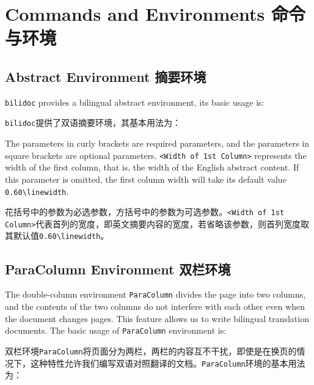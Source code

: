 \section{Commands and Environments 命令与环境}

\subsection{Abstract Environment 摘要环境}

\begin{ParaColumn}

    \verb"bilidoc" provides a bilingual abstract environment, its basic usage is:

    \switchcolumn

    \verb"bilidoc"提供了双语摘要环境，其基本用法为：

\end{ParaColumn}



\begin{ParaColumn}

    The parameters in curly brackets are required parameters, and the parameters in square brackets  are optional parameters.  \verb"<Width of 1st Column>" represents the width of the first column, that is, the width of the English abstract content. If this parameter is omitted, the first column width will take its default value \verb"0.60\linewidth".

    \switchcolumn

    花括号中的参数为必选参数，方括号中的参数为可选参数。\verb"<Width of 1st Column>"代表首列的宽度，即英文摘要内容的宽度，若省略该参数，则首列宽度取其默认值\verb"0.60\linewidth"。

\end{ParaColumn}

\subsection{ParaColumn Environment 双栏环境}

\begin{ParaColumn}

    The double-column environment \verb"ParaColumn" divides the page into two columns, and the contents of the two columns do not interfere with each other even when the document changes pages. This feature allows us to write bilingual translation documents.  The basic usage of \verb"ParaColumn" environment is:

    \switchcolumn

    双栏环境\verb"ParaColumn"将页面分为两栏，两栏的内容互不干扰，即使是在换页的情况下，这种特性允许我们编写双语对照翻译的文档。\verb"ParaColumn"环境的基本用法为：

\end{ParaColumn}

